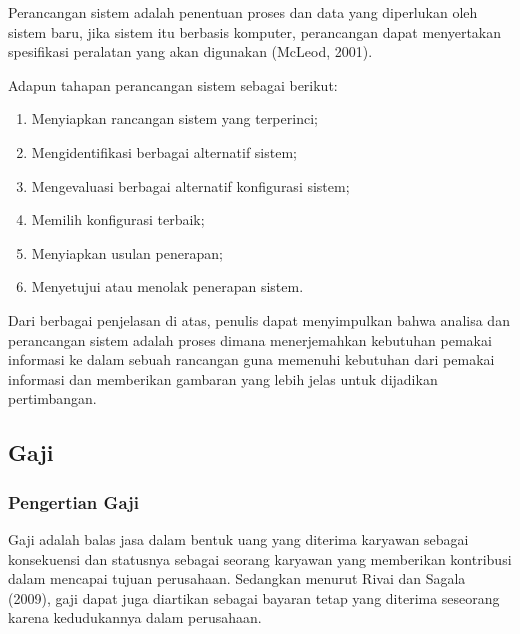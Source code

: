     Perancangan sistem adalah penentuan proses dan data yang diperlukan oleh sistem baru, jika sistem itu berbasis komputer, perancangan dapat menyertakan spesifikasi peralatan yang akan digunakan (McLeod, 2001).

    Adapun tahapan perancangan sistem sebagai berikut:
    \begin{enumerate}
      \itemsep0em
      \item Menyiapkan rancangan sistem yang terperinci;
      \item Mengidentifikasi berbagai alternatif sistem;
      \item Mengevaluasi berbagai alternatif konfigurasi sistem;
      \item Memilih konfigurasi terbaik;
      \item Menyiapkan usulan penerapan;
      \item Menyetujui atau menolak penerapan sistem.
    \end{enumerate}

    Dari berbagai penjelasan di atas, penulis dapat menyimpulkan bahwa analisa dan perancangan sistem adalah proses dimana menerjemahkan kebutuhan pemakai informasi ke dalam sebuah rancangan guna memenuhi kebutuhan dari pemakai informasi dan memberikan gambaran yang lebih jelas untuk dijadikan pertimbangan.
    
  \subsection{Gaji}
    \subsubsection{Pengertian Gaji}
    Gaji adalah balas jasa dalam bentuk uang yang diterima karyawan sebagai konsekuensi dan statusnya sebagai seorang karyawan yang memberikan kontribusi dalam mencapai tujuan perusahaan. Sedangkan menurut Rivai dan Sagala (2009), gaji dapat juga diartikan sebagai bayaran tetap yang diterima seseorang karena kedudukannya dalam perusahaan.
    
